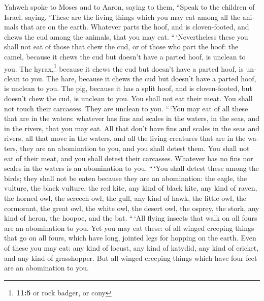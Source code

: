 \begin{paracol}{2}
\begin{otherlanguage}{english}
 Yahweh spoke to Moses and to Aaron, saying to them,
 ``Speak to the children of Israel, saying, `These are the
living things which you may eat among all the animals that are on the
earth.  Whatever parts the hoof, and is cloven-footed, and
chews the cud among the animals, that you may eat. 
``\,`Nevertheless these you shall not eat of those that chew the cud, or
of those who part the hoof: the camel, because it chews the cud but
doesn't have a parted hoof, is unclean to you.  The
hyrax,\footnote{\textbf{11:5} or rock badger, or cony} because it chews
the cud but doesn't have a parted hoof, is unclean to you.
 The hare, because it chews the cud but doesn't have a
parted hoof, is unclean to you.  The pig, because it has a
split hoof, and is cloven-footed, but doesn't chew the cud, is unclean
to you.  You shall not eat their meat. You shall not touch
their carcasses. They are unclean to you.  ``\,`You may
eat of all these that are in the waters: whatever has fins and scales in
the waters, in the seas, and in the rivers, that you may eat.
 All that don't have fins and scales in the seas and
rivers, all that move in the waters, and all the living creatures that
are in the waters, they are an abomination to you,  and
you shall detest them. You shall not eat of their meat, and you shall
detest their carcasses.  Whatever has no fins nor scales
in the waters is an abomination to you.  ``\,`You shall
detest these among the birds; they shall not be eaten because they are
an abomination: the eagle, the vulture, the black vulture,
 the red kite, any kind of black kite, 
any kind of raven,  the horned owl, the screech owl, the
gull, any kind of hawk,  the little owl, the cormorant,
the great owl,  the white owl, the desert owl, the
osprey,  the stork, any kind of heron, the hoopoe, and
the bat.  ``\,`All flying insects that walk on all fours
are an abomination to you.  Yet you may eat these: of all
winged creeping things that go on all fours, which have long, jointed
legs for hopping on the earth.  Even of these you may
eat: any kind of locust, any kind of katydid, any kind of cricket, and
any kind of grasshopper.  But all winged creeping things
which have four feet are an abomination to you.

\hypertarget{provisions-on-contamination-by-touching-the-carcasses-of-unclean-and-clean-animals}{%
}
\end{otherlanguage}
\end{paracol}
